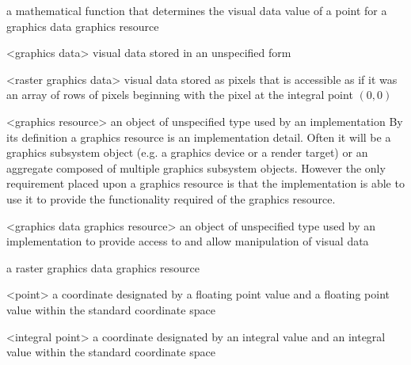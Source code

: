 a mathematical function that determines the visual data value of a point for a graphics data graphics resource

<graphics data> visual data stored in an unspecified form

<raster graphics data> visual data stored as pixels that is accessible as if it was an array of rows of pixels beginning with the pixel at the integral point $(0,0)$

<graphics resource> an object of unspecified type used by an implementation
\enternote
By its definition a graphics resource is an implementation detail. Often it will be a graphics subsystem object (e.g. a graphics device or a render target) or an aggregate composed of multiple graphics subsystem objects. However the only requirement placed upon a graphics resource is that the implementation is able to use it to provide the functionality required of the graphics resource.
\exitnote

<graphics data graphics resource> an object of unspecified type used by an implementation to provide access to and allow manipulation of visual data

%
\indexdefn{\pixmap}
a raster graphics data graphics resource

<point> a coordinate designated by a floating point \xaxis{} value and a floating point \yaxis{} value within the standard coordinate space

<integral point> a coordinate designated by an integral \xaxis{} value and an integral \yaxis{} value within the standard coordinate space

